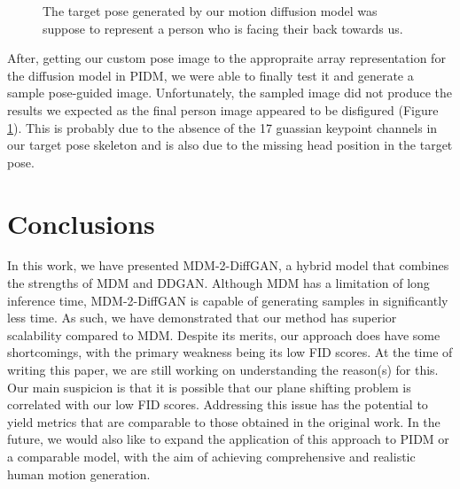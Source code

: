 \documentclass[10pt,twocolumn,letterpaper]{article}
\begin{document}
\begin{figure}[h]
    \centering

    \caption{The target pose generated by our motion diffusion model was suppose to represent a 
    person who is facing their back towards us.}
    \label{fig:pidm-2}
\end{figure}


After, getting our custom pose image to the appropraite array representation for the diffusion model in PIDM, 
we were able to finally test it and generate a sample pose-guided image. Unfortunately, the sampled image 
did not produce the results we expected as the final person image appeared to be disfigured (Figure \ref{fig:pidm-2}). 
This is probably due to the absence of the 17 guassian keypoint channels in our target pose skeleton and 
is also due to the missing head position in the target pose.


\section{Conclusions}
\label{sec:conlusions}

In this work, we have presented MDM-2-DiffGAN, a hybrid model that combines the strengths of MDM and DDGAN. Although MDM has a 
limitation of long inference time, MDM-2-DiffGAN is capable of generating samples in significantly less time. As such, we have 
demonstrated that our method has superior scalability compared to MDM. Despite its merits, our approach does have some shortcomings,
with the primary weakness being its low FID scores. At the time of writing this paper, we are still working on understanding the 
reason(s) for this. Our main suspicion is that it is possible that our plane shifting problem is correlated with our low FID scores. 
Addressing this issue has the potential to yield metrics that are comparable to those obtained in the original work. In the future, 
we would also like to expand the application of this approach to PIDM or a comparable model, with the aim of achieving comprehensive 
and realistic human motion generation.
\end{document}
